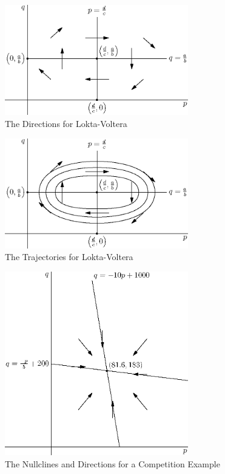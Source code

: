 \documentclass[fleqn,letterpaper]{report}
\begin{document}
\begin{figure}[t]
\centering
\includegraphics[width=8cm]{figure25.eps}
\caption{The Directions for Lokta-Voltera}
\label{figure-directions-lokta-voltera}
\end{figure}

\begin{figure}[t]
\centering
\includegraphics[width=8cm]{figure26.eps}
\caption{The Trajectories for Lokta-Voltera}
\label{figure-trajectories-lokta-voltera}
\end{figure}

\begin{figure}[t]
\centering
\includegraphics[width=8cm]{figure27.eps}
\caption{The Nullclines and Directions for a Competition
Example}
\label{figure-competition-example}
\end{figure}
\end{document}
